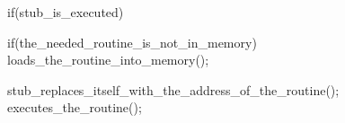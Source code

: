 \documentclass[varwidth=28.5em,crop]{standalone}
\begin{document}
\begin{ccode}
if(stub_is_executed){

  if(the_needed_routine_is_not_in_memory)
    loads_the_routine_into_memory();
 
  stub_replaces_itself_with_the_address_of_the_routine();
  executes_the_routine();
}  
\end{ccode}
\end{document}
